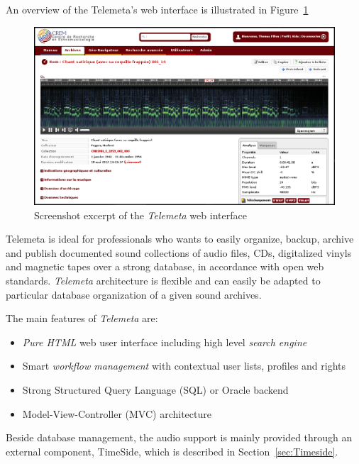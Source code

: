 \documentclass{aes53i}
\begin{document}
An overview of the Telemeta's web interface is illustrated in Figure~\ref{fig:Telemeta}
\begin{figure}
  \centering
  \includegraphics[width=0.95\linewidth]{img/telemeta.png}
  \caption[1]{Screenshot excerpt of the \emph{Telemeta} web interface}
   \label{fig:Telemeta}
\end{figure}

Telemeta is ideal for professionals who wants to easily organize, backup, archive and publish documented sound collections of audio files, CDs, digitalized vinyls and magnetic tapes over a strong database, in accordance with open web standards. 
\emph{Telemeta} architecture is flexible and can easily be adapted to particular database organization of a given sound archives. 

The main features of \emph{Telemeta} are:

\begin{itemize}
\item \emph{Pure HTML} web user interface including high level \emph{search engine}
\item Smart \emph{workflow management} with contextual user lists, profiles and rights
\item Strong Structured Query Language (SQL) or Oracle backend
\item Model-View-Controller (MVC) architecture 
\end{itemize}
Beside database management, the audio support is mainly provided through an external component, TimeSide, which is described in Section~\ref{sec:Timeside}.
\end{document}
